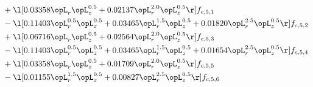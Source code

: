 \begin{alignat}{2}
& + \l[  0.03358 \opL_r \opL_z^{0.5} +  0.02137 \opL_r^{2.0} \opL_z^{0.5}  \r] f_{c,5,1} \nonumber \\ 
& - \l[  0.11403 \opL_r^{0.5} \opL_z^{0.5} +  0.03465 \opL_r^{1.5} \opL_z^{0.5} +  0.01820 \opL_r^{2.5} \opL_z^{0.5}  \r] f_{c,5,2} \nonumber \\ 
& + \l[  0.06716 \opL_r \opL_z^{0.5} +  0.02564 \opL_r^{2.0} \opL_z^{0.5}  \r] f_{c,5,3} \nonumber \\ 
& - \l[  0.11403 \opL_r^{0.5} \opL_z^{0.5} +  0.03465 \opL_r^{1.5} \opL_z^{0.5} +  0.01654 \opL_r^{2.5} \opL_z^{0.5}  \r] f_{c,5,4} \nonumber \\ 
& + \l[  0.03358 \opL_r \opL_z^{0.5} +  0.01709 \opL_r^{2.0} \opL_z^{0.5}  \r] f_{c,5,5} \nonumber \\ 
& - \l[  0.01155 \opL_r^{1.5} \opL_z^{0.5} +  0.00827 \opL_r^{2.5} \opL_z^{0.5}  \r] f_{c,5,6} \nonumber \\ 
\end{alignat} 


